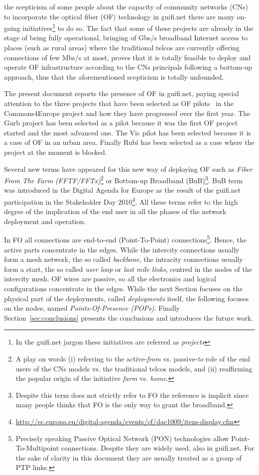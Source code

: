  the scepticism of some people about the capacity of community networks (CNs) to incorporate the optical fiber (OF) technology in guifi.net there are many on-going initiatives\footnote{In the guifi.net jargon these initiatives are referred as \emph{projects}} to do so. The fact that some of these projects are already in the stage of being fully operational, bringing of Gbs/s broadband Internet access to places (such as rural areas) where the traditional telcos are currently offering connections of few Mbs/s at most, proves that it is totally feasible to deploy and operate OF infrastructure according to the CNs principals following a bottom-up approach, thus that the aforementioned scepticism is totally unfounded.

The present document reports the presence of OF in guifi.net, paying special attention to the three projects that have been selected as OF pilots~\cite{barcelo2012bub} in the Commons4Europe project and how they have progressed over the first year. The Gurb project has been selected as a pilot because it was the first OF project started and the most advanced one. The Vic pilot has been selected because it is a case of OF in an urban area. Finally Rub\'{i} has been selected as a case where the project at the moment is blocked.

Several new terms have appeared for this new way of deploying OF such as \emph{Fiber From The Farm (FFTF/FFTx)}\footnote{A play on words (i) referring to the active-\emph{from} vs. passive-\emph{to} role of the end users of the CNs models vs. the traditional telcos models, and (ii) reaffirming the popular origin of the initiative \emph{farm} vs. \emph{home}. } or Bottom-up Broadband (BuB)\footnote{Despite this term does not strictly refer to FO the reference is implicit since many people thinks that FO is the only way to grant the broadband.}. BuB term was introduced in the Digital Agenda for Europe as the result of the guifi.net participation in the Stakeholder Day 2010\footnote{\url{http://ec.europa.eu/digital-agenda/events/cf/dae1009/item-display.cfm}}. All these terms refer to the high degree of the implication of the end user in all the phases of the network deployment and operation.

In FO all connections are end-to-end (Point-To-Point) connections\footnote{Precisely speaking Passive Optical Network (PON) technologies allow Point-To-Multipoint connections. Despite they are widely used, also in guifi.net. For the sake of clarity in this document they are usually treated as a group of PTP links.}. Hence, the active parts concentrate in the edges. While the intercity connections usually form a mesh network, the so called \emph{backbone}, the intracity connections usually form a start, the so called \emph{user loop} or \emph{last mile links}, centred in the nodes of the intercity mesh. OF wires are passive, so all the electronics and logical configurations concentrate in the edges. While the next Section focuses on the physical part of the deployments, called \emph{deployments} itself, the following focuses on the nodes, named \emph{Points-Of-Presence (POPs)}. Finally Section~\ref{sec:conclusions} presents the conclusions and introduces the future work.
